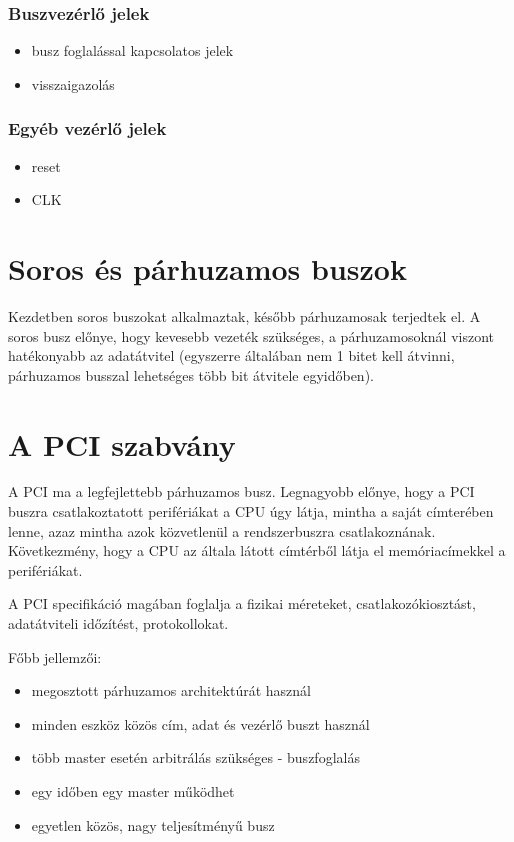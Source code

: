 \subsubsection{Buszvezérlő jelek}
\begin{itemize}
    \item busz foglalással kapcsolatos jelek
    \item visszaigazolás
\end{itemize}

\subsubsection{Egyéb vezérlő jelek}
\begin{itemize}
    \item reset
    \item CLK
\end{itemize}

\section{Soros és párhuzamos buszok}
Kezdetben soros buszokat alkalmaztak, később párhuzamosak terjedtek el.
A soros busz előnye, hogy kevesebb vezeték szükséges, a párhuzamosoknál viszont hatékonyabb az adatátvitel (egyszerre általában nem 1 bitet kell átvinni, párhuzamos busszal lehetséges több bit átvitele egyidőben).

\section{A PCI szabvány}
A PCI ma a legfejlettebb párhuzamos busz.
Legnagyobb előnye, hogy a PCI buszra csatlakoztatott perifériákat a CPU úgy látja, mintha a saját címterében lenne, azaz mintha azok közvetlenül a rendszerbuszra csatlakoznának.
Következmény, hogy a CPU az általa látott címtérből látja el memóriacímekkel a perifériákat.

A PCI specifikáció magában foglalja a fizikai méreteket, csatlakozókiosztást, adatátviteli időzítést, protokollokat.

Főbb jellemzői:
\begin{itemize}
    \item megosztott párhuzamos architektúrát használ
    \item minden eszköz közös cím, adat és vezérlő buszt használ
    \item több master esetén arbitrálás szükséges - buszfoglalás
    \item egy időben egy master működhet
    \item egyetlen közös, nagy teljesítményű busz
\end{itemize}

